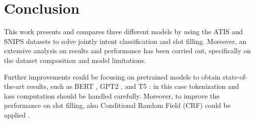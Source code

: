 \documentclass[a4paper]{article}
\begin{document}
\section{Conclusion}
This work presents and compares three different models by using the ATIS and SNIPS datasets to solve jointly intent classification and slot filling. Moreover, an extensive analysis on results and performance has been carried out, specifically on the dataset composition and model limitations.

Further improvements could be focusing on pretrained models to obtain state-of-the-art results, such as BERT \cite{DBLP:journals/corr/abs-1810-04805}, GPT2 \cite{Radford2019LanguageMA}, and T5 \cite{DBLP:journals/corr/abs-1910-10683}: in this case tokenization and loss computation should be handled carefully. Moreover, to improve the performance on slot filling, also Conditional Random Field (CRF) could be applied \cite{DBLP:journals/corr/HuangXY15}.



\end{document}
